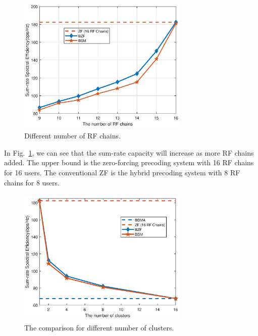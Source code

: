 \documentclass[conference]{IEEEtran}
\begin{document}
{\begin{figure}[ht]
	\begin{center}
		\includegraphics[width=3.2in,height=2.6in]{Figure/differentRF1path.eps}
		\caption{Different number of RF chains.}\label{fig:RFchains}
	\end{center}
\end{figure}
In Fig.~\ref{fig:RFchains}, we can see that the sum-rate capacity will increase as more RF chains added. The upper bound is the zero-forcing precoding system with 16 RF chains for 16 users. The conventional ZF is the hybrid precoding system with 8 RF chains for 8 users.

\begin{figure}[ht]
	\begin{center}
		\includegraphics[width=3.2in,height=2.6in]{Figure/differentK1path.eps}
		\caption{The comparison for different number of clusters.}\label{fig:differentK}
	\end{center}
\end{figure}

}
\end{document}
